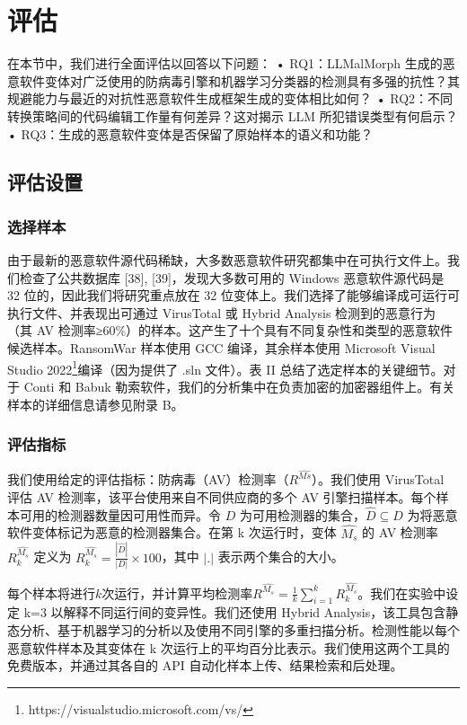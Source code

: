 \chapter{评估}
在本节中，我们进行全面评估以回答以下问题：
• RQ1：LLMalMorph 生成的恶意软件变体对广泛使用的防病毒引擎和机器学习分类器的检测具有多强的抗性？其规避能力与最近的对抗性恶意软件生成框架生成的变体相比如何？
• RQ2：不同转换策略间的代码编辑工作量有何差异？这对揭示 LLM 所犯错误类型有何启示？
• RQ3：生成的恶意软件变体是否保留了原始样本的语义和功能？

\section{评估设置}

\subsection{选择样本}
由于最新的恶意软件源代码稀缺，大多数恶意软件研究都集中在可执行文件上。我们检查了公共数据库 [38], [39]，发现大多数可用的 Windows 恶意软件源代码是 32 位的，因此我们将研究重点放在 32 位变体上。我们选择了能够编译成可运行可执行文件、并表现出可通过 VirusTotal 或 Hybrid Analysis 检测到的恶意行为（其 AV 检测率≥60\%）的样本。这产生了十个具有不同复杂性和类型的恶意软件候选样本。RansomWar 样本使用 GCC 编译，其余样本使用 Microsoft Visual Studio 2022\footnote{https://visualstudio.microsoft.com/vs/}编译（因为提供了 .sln 文件）。表 II 总结了选定样本的关键细节。对于 Conti 和 Babuk 勒索软件，我们的分析集中在负责加密的加密器组件上。有关样本的详细信息请参见附录 B。

\subsection{评估指标}
我们使用给定的评估指标：防病毒（AV）检测率（$R^{\hat{Ms}}$）。我们使用 VirusTotal 评估 AV 检测率，该平台使用来自不同供应商的多个 AV 引擎扫描样本。每个样本可用的检测器数量因可用性而异。令 $D$ 为可用检测器的集合，$\hat{D} \subseteq D$ 为将恶意软件变体标记为恶意的检测器集合。在第 k 次运行时，变体 $\hat{M_{s}}$ 的 AV 检测率 $R^{\hat{M_{s}}}_{k}$ 定义为 $R^{\hat{M_{s}}}_{k} = \frac{|\hat{D}|}{|D|} \times 100$，其中 $|.|$ 表示两个集合的大小。

每个样本将进行$k$次运行，并计算平均检测率$R^{\hat{M_{s}}}=\frac{1}{k} \sum_{i=1}^{k} R_{k}^{\hat{M_{s}}}$。我们在实验中设定 k=3 以解释不同运行间的变异性。我们还使用 Hybrid Analysis，该工具包含静态分析、基于机器学习的分析以及使用不同引擎的多重扫描分析。检测性能以每个恶意软件样本及其变体在 k 次运行上的平均百分比表示。我们使用这两个工具的免费版本，并通过其各自的 API 自动化样本上传、结果检索和后处理。